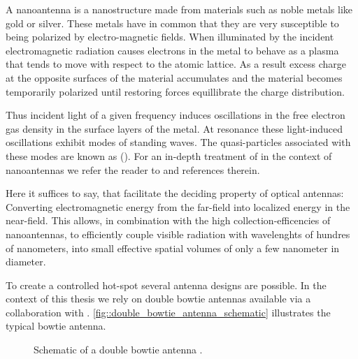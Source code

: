 		A nanoantenna is a nanostructure made from materials such as noble metals like gold or silver. These metals have in common that they are very susceptible to being polarized by electro-magnetic fields. When illuminated by the incident electromagnetic radiation causes electrons in the metal to behave as a plasma that tends to move with respect to the atomic lattice. As a result excess charge at the opposite surfaces of the material accumulates and the material becomes temporarily polarized until restoring forces equillibrate the charge distribution.

		Thus incident light of a given frequency induces oscillations in the free electron gas density in the surface layers of the metal. At resonance these light-induced oscillations exhibit modes of standing waves. The quasi-particles associated with these modes are known as \lsps (\LSPs).
		For an in-depth treatment of \LSPs in the context of nanoantennas we refer the reader to \cite{nancy::thesis} and references therein.

		Here it suffices to say, that \LSPs facilitate the deciding property of optical antennas: Converting electromagnetic energy from the far-field into localized energy in the near-field. This allows, in combination with the high collection-efficencies of nanoantennas, to efficiently couple visible radiation with wavelenghts of hundres of nanometers, into small effective spatial volumes of only a few nanometer in diameter.

		To create a controlled hot-spot several antenna designs are possible. In the context of this thesis we rely on double bowtie antennas available via a collaboration with \nancy. \autoref{fig::double_bowtie_antenna_schematic} illustrates the typical bowtie antenna.

		\begin{figure}[thp]
				\centering
				\caption[Schematic of a double bowtie antenna]{Schematic of a double bowtie antenna \cite{nancy::thesis, Rahbany2015, Rahbany2016}.}
				\label{fig::double_bowtie_antenna_schematic}
		\end{figure}

